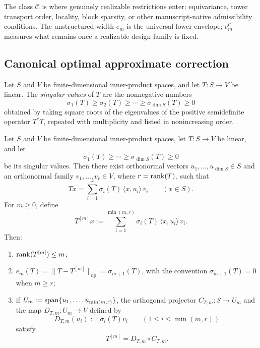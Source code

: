\begin{remark}
\label{rem:structured-correction-native-examples}
The class \(\mathcal C\) is where genuinely realizable restrictions enter:
equivariance, tower transport order, locality, block sparsity, or other
manuscript-native admissibility conditions. The unstructured width \(e_m\) is
the universal lower envelope; \(e_m^{\mathcal C}\) measures what remains once a
realizable design family is fixed.
\end{remark}

\subsection{Canonical optimal approximate correction}

\begin{definition}
\label{def:singular-values}
Let \(S\) and \(V\) be finite-dimensional inner-product spaces, and let
\(T:S\to V\) be linear. The \emph{singular values} of \(T\) are the nonnegative
numbers
\[
\sigma_1(T)\ge \sigma_2(T)\ge \cdots \ge \sigma_{\dim S}(T)\ge 0
\]
obtained by taking square roots of the eigenvalues of the positive
semidefinite operator \(T^\ast T\), repeated with multiplicity and listed in
nonincreasing order.
\end{definition}

\begin{theorem}
\label{thm:optimal-m-channel-approximation}
Let \(S\) and \(V\) be finite-dimensional inner-product spaces, let
\(T:S\to V\) be linear, and let
\[
\sigma_1(T)\ge \cdots \ge \sigma_{\dim S}(T)\ge 0
\]
be its singular values. Then there exist orthonormal vectors
\(u_1,\dots,u_{\dim S}\in S\) and an orthonormal family
\(v_1,\dots,v_r\in V\), where \(r=\mathrm{rank}(T)\), such that
\[
Tx=\sum_{i=1}^{r}\sigma_i(T)\,\langle x,u_i\rangle\,v_i
\qquad (x\in S).
\]
For \(m\ge 0\), define
\[
T^{[m]}x
:=
\sum_{i=1}^{\min(m,r)} \sigma_i(T)\,\langle x,u_i\rangle\,v_i.
\]
Then:
\begin{enumerate}[label=(\roman*), leftmargin=2em, itemsep=0.2em]
\item \(\mathrm{rank}(T^{[m]})\le m\);
\item \(e_m(T)=\|T-T^{[m]}\|_{\mathrm{op}}=\sigma_{m+1}(T)\), with the
      convention \(\sigma_{m+1}(T)=0\) when \(m\ge r\);
\item if \(U_m:=\mathrm{span}\{u_1,\dots,u_{\min(m,r)}\}\), the orthogonal projector
      \(C_{T,m}:S\to U_m\) and the map \(D_{T,m}:U_m\to V\) defined by
      \[
      D_{T,m}(u_i):=\sigma_i(T)v_i
      \qquad
      (1\le i\le \min(m,r))
      \]
      satisfy
      \[
      T^{[m]}=D_{T,m}\circ C_{T,m}.
      \]
\end{enumerate}
\end{theorem}


